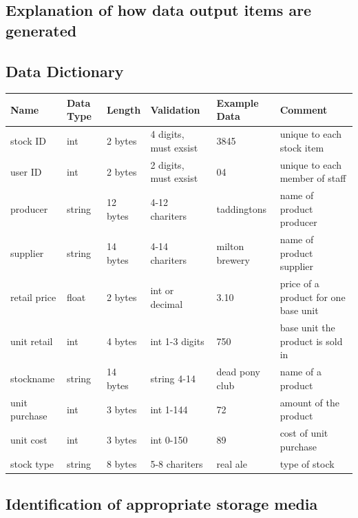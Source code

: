 \subsection{Explanation of how data output items are generated}

\subsection{Data Dictionary}
\begin{center}
\begin{tabular}{|l|l|l|l|l|l|}
    \hline
    \textbf{Name} & \textbf{Data Type} & \textbf{Length} & \textbf{Validation} & \textbf{Example Data} & \textbf{Comment} \\ \hline
	stock ID & int & 2 bytes & 4 digits, must exsist & 3845 & unique to each stock item\\ \hline
	user ID & int & 2 bytes & 2 digits, must exsist & 04 & unique to each member of staff\\ \hline
	producer & string & 12 bytes & 4-12 chariters & taddingtons & name of product producer\\ \hline
	supplier & string & 14 bytes & 4-14 chariters & milton brewery & name of product supplier \\ \hline
	retail price & float & 2 bytes & int or decimal & 3.10 & price of a product for one base unit\\ \hline
	unit retail & int & 4 bytes & int 1-3 digits & 750 & base unit the product is sold in\\ \hline
	stockname & string & 14 bytes & string 4-14 & dead pony club & name of a product\\ \hline
	unit purchase & int & 3 bytes & int 1-144 & 72 & amount of the product\\ \hline
	unit cost & int & 3 bytes & int 0-150 & 89 & cost of unit purchase\\ \hline
	stock type & string & 8 bytes & 5-8 chariters & real ale & type of stock\\ \hline
	 
\end{tabular}
\label{tab:range_examples}
\end{center}

\subsection{Identification of appropriate storage media}

  


